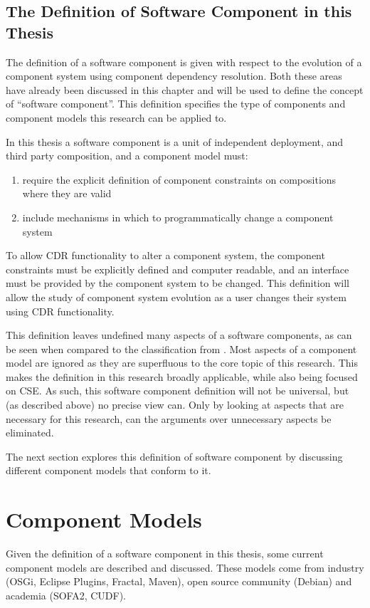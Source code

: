 \subsection{The Definition of Software Component in this Thesis}
The definition of a software component is given with respect to the evolution of a component system using component dependency resolution.
Both these areas have already been discussed in this chapter and will be used to define the concept of ``software component''.
This definition specifies the type of components and component models this research can be applied to.

In this thesis a software component is a unit of independent deployment, and third party composition,
and a component model must:
\begin{enumerate}
  \item require the explicit definition of component constraints on compositions where they are valid 
  \item include mechanisms in which to programmatically change a component system
\end{enumerate}

To allow CDR functionality to alter a component system, the component constraints must be explicitly defined and computer readable,
and an interface must be provided by the component system to be changed. 
This definition will allow the study of component system evolution as a user changes their system using CDR functionality.

This definition leaves undefined many aspects of a software components, as can be seen when compared to the classification from \citep{Crnkovic2011}.
Most aspects of a component model are ignored as they are superfluous to the core topic of this research.
This makes the definition in this research broadly applicable, while also being focused on CSE.
As such, this software component definition will not be universal, but (as described above) no precise view can.
Only by looking at aspects that are necessary for this research, can the arguments over unnecessary aspects be eliminated. 

The next section explores this definition of software component by discussing different component models that conform to it.

\section{Component Models}
\label{background.models}
Given the definition of a software component in this thesis, some current component models are described and discussed.
These models come from industry (OSGi, Eclipse Plugins, Fractal, Maven), open source community (Debian) and academia (SOFA2, CUDF).

